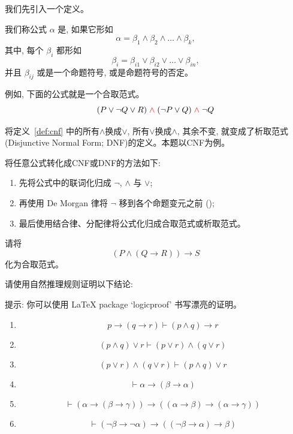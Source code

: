 \documentclass[a4paper, justified]{tufte-handout}
\begin{document}
\begin{problem}[合取范式与析取范式]
  我们先引入一个定义。

  \begin{definition}
    \label{def:cnf}
    我们称公式 $\alpha$ 是, 如果它形如
    \[
      \alpha = \beta_{1} \land \beta_{2} \land \dots \land \beta_{k},
    \]
    其中, 每个 $\beta_{i}$ 都形如
    \[
      \beta_{i} = \beta_{i1} \lor \beta_{i2} \lor \dots \lor \beta_{in},
    \]
    并且 $\beta_{ij}$ 或是一个命题符号, 或是命题符号的否定。
  \end{definition}

  例如, 下面的公式就是一个合取范式。
  \[
    (P \lor \lnot Q \lor R) \;\textcolor{red}{\land}\; (\lnot P \lor Q) \;\textcolor{red}{\land}\; \lnot Q
  \]

  将定义~\ref{def:cnf} 中的所有$\land$换成$\lor$, 所有$\lor$换成$\land$, 其余不变,
  就变成了析取范式 (Disjunctive Normal Form; DNF)的定义。本题以CNF为例。

  将任意公式转化成CNF或DNF的方法如下:
  \begin{enumerate}[(1)]
    \item 先将公式中的联词化归成 $\lnot$, $\land$ 与 $\lor$;
    \item 再使用 De Morgan 律将 $\lnot$ 移到各个命题变元之前 ();
    \item 最后使用结合律、分配律将公式化归成合取范式或析取范式。
  \end{enumerate}

  请将
  \[
    (P \land (Q \to R)) \to S
  \]
  化为合取范式。
\end{problem}

\begin{solution}
\end{solution}

\begin{problem}[命题逻辑的自然推理系统]
  请使用自然推理规则证明以下结论:

  {提示: 你可以使用 \LaTeX{} package `logicproof' 书写漂亮的证明。}
  \begin{enumerate}[(1)]
    \item
      \[
        p  \to (q \to r) \vdash (p \land q) \to r
      \]
    \item
      \[
        (p \land q) \lor r \vdash (p \lor r) \land (q \lor r)
      \]
    \item
      \[
        (p \lor r) \land (q \lor r) \vdash (p \land q) \lor r
      \]
    \item
      \[
        \vdash \alpha \to (\beta \to \alpha)
      \]
    \item
      \[
        \vdash (\alpha \to (\beta \to \gamma)) \to ((\alpha \to \beta) \to (\alpha \to \gamma))
      \]
    \item
      \[
        \vdash (\lnot \beta \to \lnot \alpha) \to ((\lnot \beta \to \alpha) \to \beta)
      \]
  \end{enumerate}
\end{problem}
\end{document}
